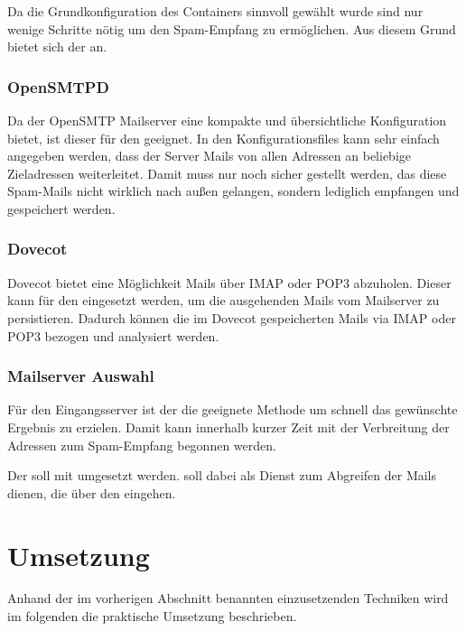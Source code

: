 \documentclass[a4paper,11pt,singlespacing]{article}
\begin{document}
			Da die Grundkonfiguration des Containers sinnvoll gewählt wurde sind nur wenige Schritte nötig um den Spam-Empfang zu ermöglichen.
			Aus diesem Grund bietet sich der  an.

		\subsubsection{OpenSMTPD}\label{sec:AuswahlLösungOpenSMTPD}
			Da der OpenSMTP Mailserver eine kompakte und übersichtliche Konfiguration bietet, ist dieser für den  geeignet.
			In den Konfigurationsfiles kann sehr einfach angegeben werden, dass der Server Mails von allen Adressen an beliebige Zieladressen weiterleitet.
			Damit muss nur noch sicher gestellt werden, das diese Spam-Mails nicht wirklich nach au{\ss}en gelangen, sondern lediglich empfangen und gespeichert werden.

		\subsubsection{Dovecot}\label{sec:AuswahlLösungDovecot}
			Dovecot bietet eine Möglichkeit Mails über IMAP oder POP3 abzuholen.
			Dieser kann für den  eingesetzt werden, um die ausgehenden Mails vom Mailserver zu persistieren.
			Dadurch können die im Dovecot gespeicherten Mails via IMAP oder POP3 bezogen und analysiert werden.

		\subsubsection{Mailserver Auswahl}\label{sec:MailserverAuswahl}	
			Für den Eingangsserver ist der  die geeignete Methode um schnell das gewünschte Ergebnis zu erzielen.
			Damit kann innerhalb kurzer Zeit mit der Verbreitung der Adressen zum Spam-Empfang begonnen werden.

			Der  soll mit  umgesetzt werden.
			 soll dabei als Dienst zum Abgreifen der Mails dienen, die über den  eingehen.

\newpage


\section{Umsetzung}\label{sec:Umsetzung}
	Anhand der im vorherigen Abschnitt benannten einzusetzenden Techniken wird im folgenden die praktische Umsetzung beschrieben.
	
\end{document}
